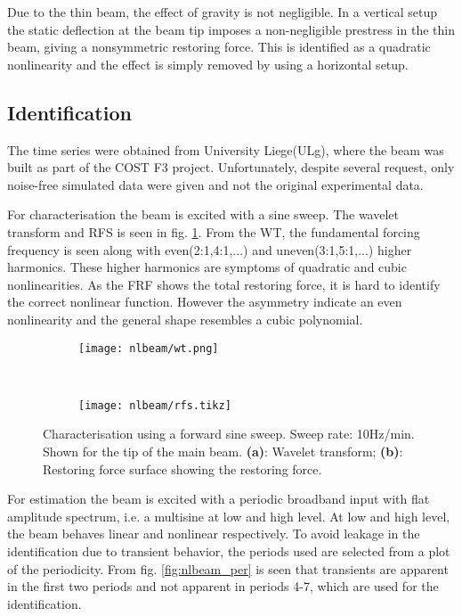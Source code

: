 Due to the thin beam, the effect of gravity is not negligible. In a vertical
setup the static deflection at the beam tip imposes a non-negligible prestress
in the thin beam, giving a nonsymmetric restoring force. This is identified as a
quadratic nonlinearity and the effect is simply removed by using a horizontal
setup.

\subsection{Identification}

The time series were obtained from University Liege(ULg), where the beam was
built as part of the COST F3 project. Unfortunately, despite several request,
only noise-free simulated data were given and not the original experimental
data.

For characterisation the beam is excited with a sine sweep. The wavelet
transform and RFS is seen in fig. \ref{fig:nlbeam_characterisation}. From the
WT, the fundamental forcing frequency is seen along with even(2:1,4:1,...) and
uneven(3:1,5:1,...) higher harmonics. These higher harmonics are symptoms of
quadratic and cubic nonlinearities.
As the FRF shows the total restoring force, it is hard to identify the correct
nonlinear function. However the asymmetry indicate an even nonlinearity and the general
shape resembles a cubic polynomial.

\begin{figure}
  \centering
  \begin{subfigure}[b]{0.45\textwidth}
    \texttt{[image: nlbeam/wt.png]}
    \caption{}
  \end{subfigure}
  ~
  \begin{subfigure}[b]{0.45\textwidth}
    \texttt{[image: nlbeam/rfs.tikz]}
    \caption{}
  \end{subfigure}
  \caption{Characterisation using a forward sine sweep. Sweep rate: 10Hz/min.
    Shown for the tip of the main beam.
    \textbf{(a)}: Wavelet transform;
    \textbf{(b)}: Restoring force surface showing the restoring force.}
  \label{fig:nlbeam_characterisation}
\end{figure}


For estimation the beam is excited with a periodic broadband input with flat
amplitude spectrum, i.e. a multisine at low and high level. At low and high
level, the beam behaves linear and nonlinear respectively. To avoid leakage in
the identification due to transient behavior, the periods used are selected from
a plot of the periodicity. From fig. \ref{fig:nlbeam_per} is seen that
transients are apparent in the first two periods and not apparent in periods
4-7, which are used for the identification.


